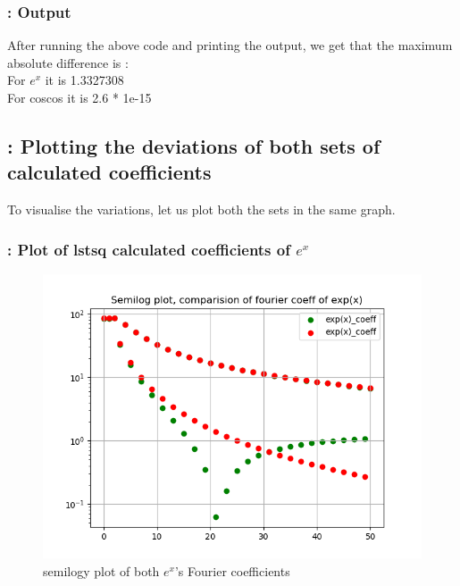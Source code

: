 \documentclass[11pt]{article}
\begin{document}
\subsubsection{: Output}
After running the above code and printing the output, we get that the maximum absolute difference is : \\
\noindent For $e^{x}$ it is 1.3327308\\
\noindent For coscos it is 2.6 * 1e-15

\subsection{: Plotting the deviations of both sets of calculated coefficients}
To visualise the variations, let us plot both the sets in the same graph.

\subsubsection{: Plot of lstsq calculated coefficients of $e^{x}$}

\begin{figure}[H]
    \centering
    \includegraphics[scale = 0.5]{Figure_11.png}
    \caption{semilogy plot of both $e^{x}$'s Fourier coefficients}
\end{figure}
\end{document}
